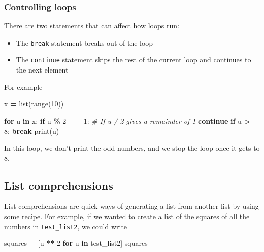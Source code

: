 \documentclass[
  letterpaper,
]{scrbook}
\newenvironment{Shaded}{\begin{snugshade}}{\end{snugshade}}
\newcommand{\BuiltInTok}[1]{#1}
\newcommand{\CommentTok}[1]{\textcolor[rgb]{0.56,0.35,0.01}{\textit{#1}}}
\newcommand{\ControlFlowTok}[1]{\textcolor[rgb]{0.13,0.29,0.53}{\textbf{#1}}}
\newcommand{\DecValTok}[1]{\textcolor[rgb]{0.00,0.00,0.81}{#1}}
\newcommand{\KeywordTok}[1]{\textcolor[rgb]{0.13,0.29,0.53}{\textbf{#1}}}
\newcommand{\NormalTok}[1]{#1}
\newcommand{\OperatorTok}[1]{\textcolor[rgb]{0.81,0.36,0.00}{\textbf{#1}}}
\providecommand{\tightlist}{%
  \setlength{\itemsep}{0pt}\setlength{\parskip}{0pt}}
\begin{document}
\hypertarget{controlling-loops}{%
\subsubsection{Controlling loops}\label{controlling-loops}}

There are two statements that can affect how loops run:

\begin{itemize}
\tightlist
\item
  The \texttt{break} statement breaks out of the loop
\item
  The \texttt{continue} statement skips the rest of the current loop and continues to the next element
\end{itemize}

For example

\begin{Shaded}
\begin{Highlighting}[]
\NormalTok{x }\OperatorTok{=} \BuiltInTok{list}\NormalTok{(}\BuiltInTok{range}\NormalTok{(}\DecValTok{10}\NormalTok{))}

\ControlFlowTok{for}\NormalTok{ u }\KeywordTok{in}\NormalTok{ x:}
    \ControlFlowTok{if}\NormalTok{ u }\OperatorTok{\%} \DecValTok{2} \OperatorTok{==} \DecValTok{1}\NormalTok{: }\CommentTok{\# If u / 2 gives a remainder of 1}
        \ControlFlowTok{continue}
    \ControlFlowTok{if}\NormalTok{ u }\OperatorTok{\textgreater{}=} \DecValTok{8}\NormalTok{:}
        \ControlFlowTok{break}
    \BuiltInTok{print}\NormalTok{(u)}
\end{Highlighting}
\end{Shaded}

In this loop, we don't print the odd numbers, and we stop the loop once it gets to 8.

\hypertarget{list-comprehensions}{%
\subsection{List comprehensions}\label{list-comprehensions}}

List comprehensions are quick ways of generating a list from another list by using some recipe. For example, if we wanted to create a list of the squares of all the numbers in \texttt{test\_list2}, we could write

\begin{Shaded}
\begin{Highlighting}[]
\NormalTok{squares }\OperatorTok{=}\NormalTok{ [u }\OperatorTok{**} \DecValTok{2} \ControlFlowTok{for}\NormalTok{ u }\KeywordTok{in}\NormalTok{ test\_list2]}
\NormalTok{squares}
\end{Highlighting}
\end{Shaded}
\end{document}
